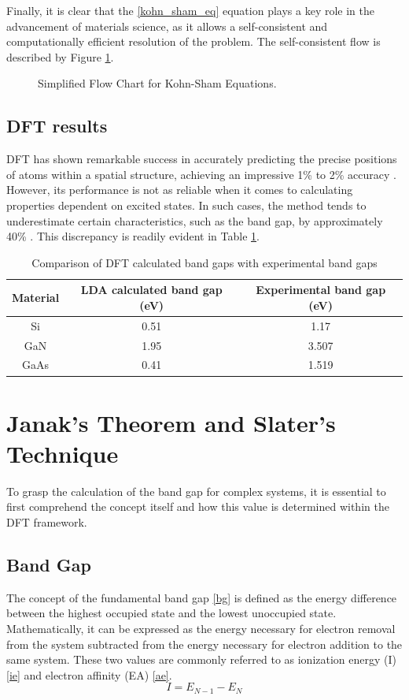 Finally, it is clear that the \ref{kohn_sham_eq} equation plays a key role in the advancement of materials science, as it allows a self-consistent and computationally efficient resolution of the problem. The self-consistent flow is described by Figure \ref{ks_fc}.

\begin{figure}[!ht]
        \centering
        
        \caption{Simplified Flow Chart for Kohn-Sham Equations.}
        \label{ks_fc}
\end{figure}

\subsection{DFT results}
DFT has shown remarkable success in accurately predicting the precise positions of atoms within a spatial structure, achieving an impressive 1\% to 2\% accuracy \cite{DFTCoursera}. However, its performance is not as reliable when it comes to calculating properties dependent on excited states. In such cases, the method tends to underestimate certain characteristics, such as the band gap, by approximately 40\% \cite{PhysRevLett.51.1884}. This discrepancy is readily evident in Table \ref{tab:bandgaps}.

\begin{table}[htbp]
\centering

\caption{Comparison of DFT calculated band gaps with experimental band gaps \cite{PhysRevB.78.125116}}
\begin{tabular}{ c c c}
\hline
\hline
Material & LDA  calculated band gap (eV) & Experimental band gap (eV) \\ \hline
Si & 0.51  & 1.17 \\ 
GaN & 1.95 & 3.507 \\ 
GaAs & 0.41 & 1.519 \\
\hline
\hline
\end{tabular}
\label{tab:bandgaps}
\end{table}

\section{Janak's Theorem and Slater's Technique}
To grasp the calculation of the band gap for complex systems, it is essential to first comprehend the concept itself and how this value is determined within the DFT framework.
\subsection{Band Gap}
The concept of the fundamental band gap \ref{bg} is defined as the energy difference between the highest occupied state and the lowest unoccupied state. Mathematically, it can be expressed as the energy necessary for electron removal from the system subtracted from the energy necessary for electron addition to the same system. These two values are commonly referred to as ionization energy (I) \ref{ie} and electron affinity (EA)  \ref{ae}\cite{DFTCoursera}.
\begin{equation}
\label{ie}
I =  E_{N-1} - E_{N}
\end{equation}

